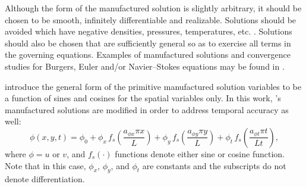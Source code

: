 \documentclass[10pt]{article}
\begin{document}
Although the form of the manufactured solution is slightly arbitrary, it should be chosen to be smooth, infinitely differentiable and realizable. Solutions should be avoided which have negative densities, pressures, temperatures, etc. \citep{KnuppSalari2003,Roy2004}. Solutions should also be chosen that are sufficiently general so as to exercise all terms in the governing equations. Examples of manufactured solutions and convergence studies for Burgers, Euler and/or Navier--Stokes equations may be found in \citet{Roy2002,KnuppSalari2003,Roy2004,Bond2007,Orozco2010}.

\citet{Roy2002} introduce the general form of the primitive manufactured solution variables to be  a function of sines and cosines for the spatial variables only. In this work, \citet{Roy2002}'s manufactured solutions are modified in order to address temporal accuracy as well:
\begin{equation*}
 \label{eq:manufactured01}
  \phi (x,y,t) = \phi_0+ \phi_x\, f_s \left(\frac{a_{\phi x} \pi x}{L} \right) +  \phi_y \,f_s\left(\frac{a_{\phi y} \pi y}{L}\right) +  \phi_t \,f_s\left(\frac{a_{\phi t} \pi t}{Lt}\right),
\end{equation*}
where $\phi=u$ or $v$, and $f_s(\cdot)$ functions denote either sine or cosine function. Note that in this case, $\phi_x$, $\phi_y$,  and $\phi_t$ are constants  and the subscripts do not denote differentiation.
% 
\end{document}
